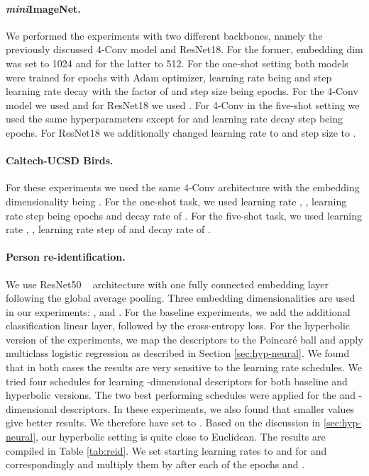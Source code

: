 \documentclass[10pt,twocolumn,letterpaper]{article}
\begin{document}
 
\paragraph{\textit{mini}ImageNet.}
We performed the experiments with two different backbones, namely the previously discussed 4-Conv model and ResNet18. For the former, embedding dim was set to 1024 and for the latter to 512. For the one-shot setting both models were trained for  epochs with Adam optimizer, learning rate being  and step learning rate decay with the factor of  and step size being  epochs. For the 4-Conv model we used  and for ResNet18 we used .
For 4-Conv in the five-shot setting we used the same hyperparameters except for  and learning rate decay step being  epochs. For ResNet18 we additionally changed learning rate to  and step size to .







\paragraph{Caltech-UCSD Birds.}
For these experiments we used the same 4-Conv architecture with the embedding dimensionality being . For the one-shot task, we used learning rate , , learning rate step being  epochs and decay rate of . For the five-shot task, we used learning rate , , learning rate step of  and decay rate of .




\paragraph{Person re-identification.}
We use ResNet50 ~\cite{he2016deep} architecture with one fully connected embedding layer following the global average pooling. Three embedding dimensionalities are used in our experiments: ,  and .
For the baseline experiments, we add the additional classification linear layer, followed by the cross-entropy loss.
For the hyperbolic version of the experiments, we map the descriptors to the Poincar\'e ball and apply multiclass logistic regression as described in Section \ref{sec:hyp-neural}.
We found that in both cases the results are very sensitive to the learning rate schedules. We tried four schedules for learning  -dimensional descriptors for both baseline and hyperbolic versions. The two best performing schedules were applied for the  and -dimensional descriptors. 
In these experiments, we also found that smaller  values give better results. We therefore have set  to . Based on the discussion in \ref{sec:hyp-neural}, our hyperbolic setting is quite close to Euclidean.
The results are compiled in Table \ref{tab:reid}. 
We set starting learning rates to  and  for  and  correspondingly and multiply them by  after each of the epochs  and .
\end{document}
